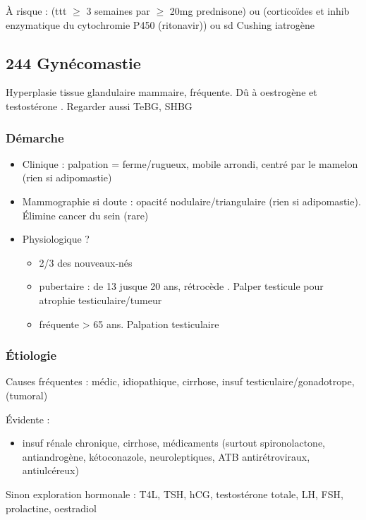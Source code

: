 \documentclass[11pt]{article}
\begin{document}
À risque : (ttt \(\ge\) 3 semaines par \(\ge\) 20mg prednisone) ou (corticoïdes et inhib enzymatique du
cytochromie P450 (ritonavir)) ou sd Cushing iatrogène
\subsection{244 \textdagger{} Gynécomastie}
\label{sec:orgbaf95d2}
Hyperplasie tissue glandulaire mammaire, fréquente. Dû à oestrogène \inc{} et testostérone \dec{}. Regarder aussi TeBG,
SHBG
\subsubsection{Démarche}
\label{sec:org8683af7}
\begin{itemize}
\item Clinique : palpation = ferme/rugueux, mobile arrondi, centré par le mamelon (rien si adipomastie)
\item Mammographie si doute : opacité nodulaire/triangulaire (rien si adipomastie). Élimine cancer du sein (rare)
\item Physiologique ? 
\begin{itemize}
\item 2/3 des nouveaux-nés
\item pubertaire : de 13 jusque 20 ans, rétrocède . Palper testicule pour atrophie testiculaire/tumeur
\item fréquente > 65 ans. Palpation testiculaire
\end{itemize}
\end{itemize}
\subsubsection{Étiologie}
\label{sec:org688ff45}
\begin{tcolorbox}
Causes fréquentes : médic, idiopathique, cirrhose, insuf testiculaire/gonadotrope, (tumoral)
\end{tcolorbox}
Évidente :
\begin{itemize}
\item insuf rénale chronique, cirrhose, médicaments (surtout spironolactone,
antiandrogène, kétoconazole, neuroleptiques, ATB antirétroviraux, antiulcéreux)
\end{itemize}
Sinon exploration hormonale : T4L, TSH, hCG, testostérone totale, LH, FSH,
prolactine, oestradiol
\end{document}
